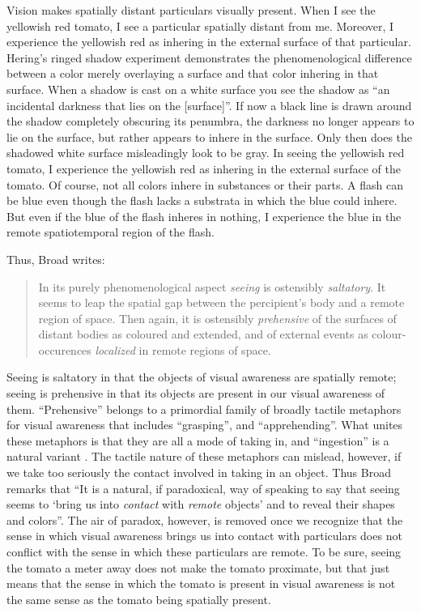 \documentclass[12pt]{article}
\begin{document}
Vision makes spatially distant particulars visually present. When I see the yellowish red tomato, I see a particular spatially distant from me. Moreover, I experience the yellowish red as inhering in the external surface of that particular. Hering's \citeyearpar[8]{Hering:1920ty} ringed shadow experiment demonstrates the phenomenological difference between a color merely overlaying a surface and that color inhering in that surface. When a shadow is cast on a white surface you see the shadow as ``an incidental darkness that lies on the [surface]''. If now a black line is drawn around the shadow completely obscuring its penumbra, the darkness no longer appears to lie on the surface, but rather appears to inhere in the surface. Only then does the shadowed white surface misleadingly look to be gray. In seeing the yellowish red tomato, I experience the yellowish red as inhering in the external surface of the tomato. Of course, not all colors inhere in substances or their parts. A flash can be blue even though the flash lacks a substrata in which the blue could inhere. But even if the blue of the flash inheres in nothing, I experience the blue in the remote spatiotemporal region of the flash. 

Thus, Broad writes:
\begin{quote}
    In its purely phenomenological aspect \emph{seeing} is ostensibly \emph{saltatory}. It seems to leap the spatial gap between the percipient's body and a remote region of space. Then again, it is ostensibly \emph{prehensive} of the surfaces of distant bodies as coloured and extended, and of external events as colour-occurences \emph{localized} in remote regions of space. \citep[32]{Broad:1965dq}
\end{quote}
Seeing is saltatory in that the objects of visual awareness are spatially remote; seeing is prehensive in that its objects are present in our visual awareness of them. ``Prehensive'' belongs to a primordial family of broadly tactile metaphors for visual awareness that includes ``grasping'', and ``apprehending''. What unites these metaphors is that they are all a mode of taking in, and ``ingestion'' is a natural variant \citep[see][7]{Johnston:2006uq,Price:1932fk}. The tactile nature of these metaphors can mislead, however, if we take too seriously the contact involved in taking in an object. Thus Broad remarks that ``It is a natural, if paradoxical, way of speaking to say that seeing seems to `bring us into \emph{contact} with \emph{remote} objects' and to reveal their shapes and colors''. The air of paradox, however, is removed once we recognize that the sense in which visual awareness brings us into contact with particulars does not conflict with the sense in which these particulars are remote. To be sure, seeing the tomato a meter away does not make the tomato proximate, but that just means that the sense in which the tomato is present in visual awareness is not the same sense as the tomato being spatially present.
\end{document}
